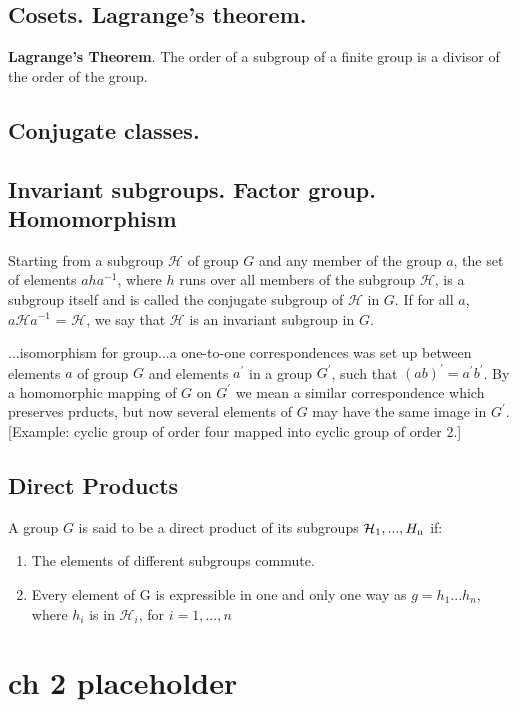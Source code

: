 \documentclass{book}
\begin{document}
\section{Cosets. Lagrange's theorem.}

{\bf Lagrange's Theorem}. The order of a subgroup of a finite group is
a divisor of the order of the group.

\section{Conjugate classes.}

\section{Invariant subgroups. Factor group. Homomorphism}

Starting from a subgroup $\mathcal H$ of group $G$ and any member of
the group $a$, the set of elements $aha^{-1}$, where $h$ runs over all
members of the subgroup $\mathcal H$, is a subgroup itself and is
called the conjugate subgroup of $\mathcal H$ in $G$. If for all $a$,
$a{\mathcal H} a^{-1}$ = $\mathcal H$, we say that $\mathcal H$ is an
invariant subgroup in $G$.

...isomorphism for group...a one-to-one correspondences was set up
between elements $a$ of group $G$ and elements $a^\prime$ in a group
$G^\prime$, such that $(ab)^\prime = a^\prime b^\prime$. By a
homomorphic mapping of $G$ on $G^\prime$ we mean a similar
correspondence which preserves prducts, but now several elements of
$G$ may have the same image in $G^\prime$. [Example: cyclic group of
  order four mapped into cyclic group of order 2.]

\section{Direct Products}

A group $G$ is said to be a direct product of its subgroups ${\mathcal H_{\rm 1},...,H_{\rm n}}$ if:

\begin{enumerate}
\item The elements of different subgroups commute.
\item Every element of G is expressible in one and only one way as
  $g = h_1...h_n$, where $h_i$ is in ${\mathcal H}_i$, for $i = 1,...,n$
\end{enumerate}

\chapter{ch 2 placeholder}
\end{document}
